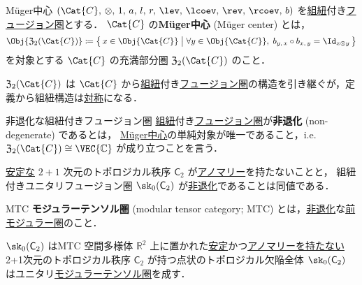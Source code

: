 \documentclass[TQFT_main]{subfiles}
\begin{document}
\begin{mydef}[label=def:Muger-center]{M\"{u}ger中心}
    $(\Cat{C},\, \otimes,\, 1,\, a,\, l,\, r,\, \lev,\, \lcoev,\, \rev,\, \rcoev,\, b)$ を\hyperref[redef:braided-monoidal]{組紐}付き\hyperref[def:tensorfusion-cat]{フュージョン圏}とする．
    $\Cat{C}$ の\textbf{M\"{u}ger中心} (M\"{u}ger center) とは，
    \begin{align}
        \Obj{\mathfrak{Z}_2 (\Cat{C})} \coloneqq \bigl\{\, x \in \Obj{\Cat{C}} \bigm| \forall y \in \Obj{\Cat{C}},\; b_{y,\, x} \circ b_{x,\, y} = \Id_{x \otimes y} \,\bigr\} 
    \end{align}
    を対象とする $\Cat{C}$ の充満部分圏 $\mathfrak{Z}_2 (\Cat{C})$ のこと．
\end{mydef}
$\mathfrak{Z}_2 (\Cat{C})$ は $\Cat{C}$ から\hyperref[redef:braided-monoidal]{組紐}付き\hyperref[def:tensorfusion-cat]{フュージョン圏}の構造を引き継ぐが，定義から組紐構造は\hyperref[redef:braided-monoidal]{対称}になる．

\begin{mydef}[label=def:nondegen-BFC]{非退化な組紐付きフュージョン圏}
    \hyperref[redef:braided-monoidal]{組紐}付き\hyperref[def:tensorfusion-cat]{フュージョン圏}が\textbf{非退化} (non-degenerate) であるとは，
    \hyperref[def:Muger-center]{M\"{u}ger中心}の単純対象が唯一であること，i.e. $\mathfrak{Z}_2 (\Cat{C}) \cong \VEC{\mathbb{C}}$ が成り立つことを言う．
\end{mydef}

\begin{mypropph}[label=prop:remote-detectable]{}
    \hyperref[def:stableTO]{安定な} $2+1$ 次元のトポロジカル秩序 $\mathsf{C}_2$ が\hyperref[def:anomalousQP]{アノマリー}を持たないことと，
    組紐付きユニタリフュージョン圏 $\sk_0(\mathsf{C}_2)$ が\hyperref[def:nondegen-BFC]{非退化}であることは同値である．
\end{mypropph}

\begin{mydef}[label=def:MTC]{MTC}
    \textbf{モジュラーテンソル圏} (modular tensor category; MTC) とは，\hyperref[def:nondegen-BFC]{非退化}な\hyperref[def:premodular-cat]{前モジュラー圏}のこと．
\end{mydef}

\begin{mypropph}[label=prop:sk0-braided]{$\sk_0(\mathsf{C}_2)$ はMTC}
    空間多様体 $\mathbb{R}^2$ 上に置かれた\hyperref[def:stableTO]{安定}かつ\hyperref[def:anomalousQP]{アノマリーを持たない} 2+1次元のトポロジカル秩序 $\mathsf{C}_2$ が持つ点状のトポロジカル欠陥全体
    $\sk_0(\mathsf{C}_2)$ はユニタリ\hyperref[def:MTC]{モジュラーテンソル圏}を成す．
\end{mypropph}
\end{document}
